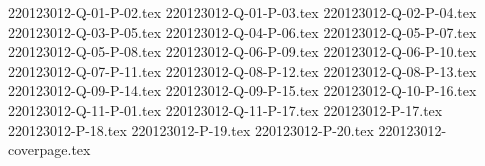 \documentclass{article}                              %
\begin{document}
{220123012-Q-01-P-02.tex}
{220123012-Q-01-P-03.tex}
{220123012-Q-02-P-04.tex}
{220123012-Q-03-P-05.tex}
{220123012-Q-04-P-06.tex}
{220123012-Q-05-P-07.tex}
{220123012-Q-05-P-08.tex}
{220123012-Q-06-P-09.tex}
{220123012-Q-06-P-10.tex}
{220123012-Q-07-P-11.tex}
{220123012-Q-08-P-12.tex}
{220123012-Q-08-P-13.tex}
{220123012-Q-09-P-14.tex}
{220123012-Q-09-P-15.tex}
{220123012-Q-10-P-16.tex}
{220123012-Q-11-P-01.tex}
{220123012-Q-11-P-17.tex}
{220123012-P-17.tex}
{220123012-P-18.tex}
{220123012-P-19.tex}
{220123012-P-20.tex}
{220123012-coverpage.tex}
\end{document}
